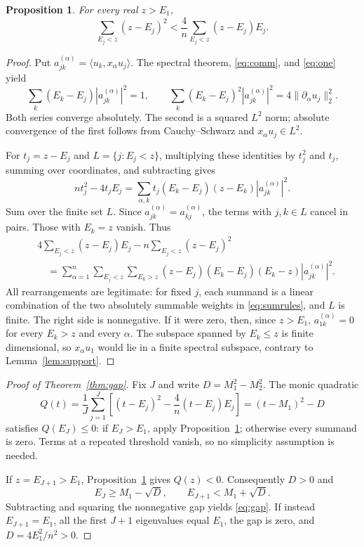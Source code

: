 \documentclass[10pt]{article}
\newtheorem{proposition}[theorem]{Proposition}
\begin{document}
\begin{proposition}\label{prop:yang}
For every real $z>E_1$,
\begin{equation}\label{eq:strict}
 \sum_{E_j<z}(z-E_j)^2
 <\frac4n\sum_{E_j<z}(z-E_j)E_j.
\end{equation}
\end{proposition}
\begin{proof}
Put $a_{jk}^{(\alpha)}=\langle u_k,x_\alpha u_j\rangle$.
The spectral theorem, \eqref{eq:comm}, and \eqref{eq:one} yield
\begin{equation}\label{eq:sumrules}
 \sum_k(E_k-E_j)|a_{jk}^{(\alpha)}|^2=1,
 \qquad
 \sum_k(E_k-E_j)^2|a_{jk}^{(\alpha)}|^2
 =4\|\partial_\alpha u_j\|_2^2.
\end{equation}
Both series converge absolutely. The second is a squared $L^2$ norm; absolute convergence of the first follows from Cauchy--Schwarz and $x_\alpha u_j\in L^2$.

For $t_j=z-E_j$ and $L=\{j:E_j<z\}$, multiplying these identities by $t_j^2$ and $t_j$, summing over coordinates, and subtracting gives
\[
 nt_j^2-4t_jE_j
 =\sum_{\alpha,k}t_j(E_k-E_j)(z-E_k)|a_{jk}^{(\alpha)}|^2.
\]
Sum over the finite set $L$. Since $a_{jk}^{(\alpha)}=a_{kj}^{(\alpha)}$, the terms with $j,k\in L$ cancel in pairs. Those with $E_k=z$ vanish. Thus
\begin{equation}\label{eq:remainder}
\begin{aligned}
 &4\sum_{E_j<z}(z-E_j)E_j-n\sum_{E_j<z}(z-E_j)^2\\
 &\quad=\sum_{\alpha=1}^n\sum_{E_j<z}\sum_{E_k>z}
 (z-E_j)(E_k-E_j)(E_k-z)|a_{jk}^{(\alpha)}|^2.
\end{aligned}
\end{equation}
All rearrangements are legitimate: for fixed $j$, each summand is a linear combination of the two absolutely summable weights in \eqref{eq:sumrules}, and $L$ is finite.
The right side is nonnegative. If it were zero, then, since $z>E_1$,
$a_{1k}^{(\alpha)}=0$ for every $E_k>z$ and every $\alpha$.
The subspace spanned by $E_k\le z$ is finite dimensional, so $x_\alpha u_1$ would lie in a finite spectral subspace, contrary to Lemma~\ref{lem:support}.
\end{proof}

\begin{proof}[Proof of Theorem~\ref{thm:gap}]
Fix $J$ and write $D=M_1^2-M_2^2$. The monic quadratic
\begin{equation}\label{eq:quad}
 Q(t)=\frac1J\sum_{j=1}^J\left[(t-E_j)^2-\frac4n(t-E_j)E_j\right]
 =(t-M_1)^2-D
\end{equation}
satisfies $Q(E_J)\le0$: if $E_J>E_1$, apply Proposition~\ref{prop:yang}; otherwise every summand is zero. Terms at a repeated threshold vanish, so no simplicity assumption is needed.

If $z=E_{J+1}>E_1$, Proposition~\ref{prop:yang} gives $Q(z)<0$.
Consequently $D>0$ and
\[
 E_J\ge M_1-\sqrt D,\qquad E_{J+1}<M_1+\sqrt D.
\]
Subtracting and squaring the nonnegative gap yields \eqref{eq:gap}.
If instead $E_{J+1}=E_1$, all the first $J+1$ eigenvalues equal $E_1$, the gap is zero, and $D=4E_1^2/n^2>0$.
\end{proof}
\end{document}
